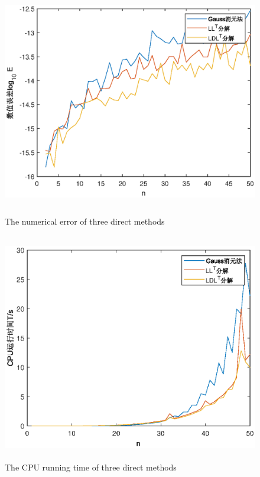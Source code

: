 \documentclass[UTF8,a4paper,10pt]{ctexart}
\begin{document}
\begin{figure}[ht]
    \centering
    \includegraphics[width=14cm,height=10cm]{1.1_error.eps}
    \caption{The numerical error of three direct methods}
\end{figure}
\begin{figure}[ht]
    \centering
    \includegraphics[width=14cm,height=10cm]{1.1_cpu_time.eps}
    \caption{The CPU running time of three direct methods}
\end{figure}
\end{document}
